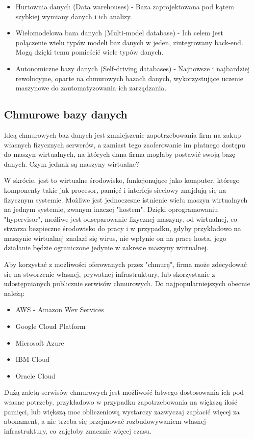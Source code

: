 \documentclass[12pt, a4paper]{article}
\begin{document}
\begin{sloppypar}
{{\begin{itemize}
      bazy danych, projektowane z myślą o dużej ilości transakcji wykonywanych pomiędzy
      wieloma użytkownikami. 
      \item Hurtownia danych (Data warehouses) - Baza zaprojektowana pod kątem
      szybkiej wymiany danych i ich analizy.
      \item Wielomodelowa baza danych (Multi-model database) - Ich celem jest połączenie
      wielu typów modeli baz danych w jeden, zintegrowany back-end. Mogą dzięki temu
      pomieścić wiele typów danych.
      \item Autonomiczne bazy danych (Self-driving databases) - Najnowsze i najbardziej
      rewolucyjne, oparte na chmurowych bazach danych, wykorzystujące uczenie
      maszynowe do zautomatyzowania ich zarządzania.
    \end{itemize}
  }
  \subsection{Chmurowe bazy danych}
  {
    Ideą chmurowych baz danych jest zmniejszenie zapotrzebowania firm na zakup własnych
    fizycznych serwerów, a zamiast tego zaoferowanie im płatnego dostępu do maszyn
    wirtualnych, na których dana firma mogłaby postawić swoją bazę danych. Czym jednak
    są maszyny wirtualne? 
    
    W skrócie, jest to wirtualne środowisko, funkcjonujące jako
    komputer, którego komponenty takie jak procesor, pamięć i interfejs sieciowy
    znajdują się na fizycznym systemie. Możliwe jest jednoczesne istnienie wielu maszyn
    wirtualnych na jednym systemie, zwanym inaczej "hostem". Dzięki oprogramowaniu
    "hypervisor", możliwe jest odseparowanie fizycznej maszyny, od wirtualnej,
    co stwarza bezpieczne środowisko do pracy i w przypadku, gdyby przykładowo na
    maszynie wirtualnej znalazł się wirus, nie wpłynie on na pracę hosta, jego
    działanie będzie ograniczone jedynie w zakresie maszyny wirtualnej.

    Aby korzystać z możliwości oferowanych przez "chmurę", firma może zdecydować się
    na stworzenie własnej, prywatnej infrastruktury, lub skorzystanie z udostępnianych
    publicznie serwisów chmurowych. Do najpopularniejszych obecnie należą:
    \begin{itemize}
      \item AWS - Amazon Wev Services
      \item Google Cloud Platform
      \item Microsoft Azure
      \item IBM Cloud
      \item Oracle Cloud
    \end{itemize}
    Dużą zaletą serwisów chmurowych jest możliwość łatwego dostosowania ich pod własne
    potrzeby, przykładowo w przypadku zapotrzebowania na większą ilość pamięci, lub
    większą moc obliczeniową wystarczy zazwyczaj zapłacić więcej za abonament, a nie
    trzeba się przejmować rozbudowywaniem własnej infrastruktury, co zajęłoby znacznie
    więcej czasu.
  }
}
\end{sloppypar}
\end{document}
